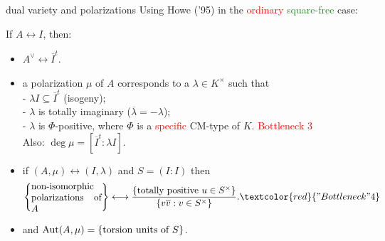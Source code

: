 \documentclass[usenames,dvipsnames]{beamer}
\newcommand{\red}[1]{\textcolor{red}{#1}}
\newcommand{\green}[1]{\textcolor{ForestGreen}{#1}}
\begin{document}
% 

\begin{frame}{ dual variety and polarizations }
Using Howe ('95) in the \red{ordinary} \green{square-free} case: 
\begin{theorem}[M.]
   If $A\leftrightarrow I$, then:
   \begin{itemize}
      \pause \item $A^\vee \leftrightarrow \overline{I}^t$.
      \pause \item a polarization $\mu$ of $A$ corresponds to a $\lambda\in K^\times$ such that\\
	    - $\lambda I \subseteq \overline{I}^t$ (isogeny);\\
	    - $\lambda$ is totally imaginary ($\overline \lambda = -\lambda$);\\
	    - $\lambda$ is $\Phi$-positive, where $\Phi$ is a \red{specific} CM-type of $K$. \red{Bottleneck 3}\\ 
      Also: $\deg \mu= [\overline{I}^t : \lambda I]$.
      \pause  \item if $(A,\mu) \leftrightarrow (I,\lambda)$ and $S=(I:I)$ then
     \vspace{-0.5em}
	      \[\set{\parbox[p]{7.5em}{non-isomorphic polarizations of $A$}} \longleftrightarrow \dfrac{\set{\text{totally positive }u\in S^\times }}{\set{v\overline{v}: v\in S^\times}}. \red{"Bottleneck" 4}\]
     \vspace{-1em}
	 \pause \item  and $\operatorname{Aut}(A,\mu) = \left\lbrace\text{torsion units of $S$}\right\rbrace$.
\end{itemize}
\end{theorem}
\end{frame}
\end{document}
